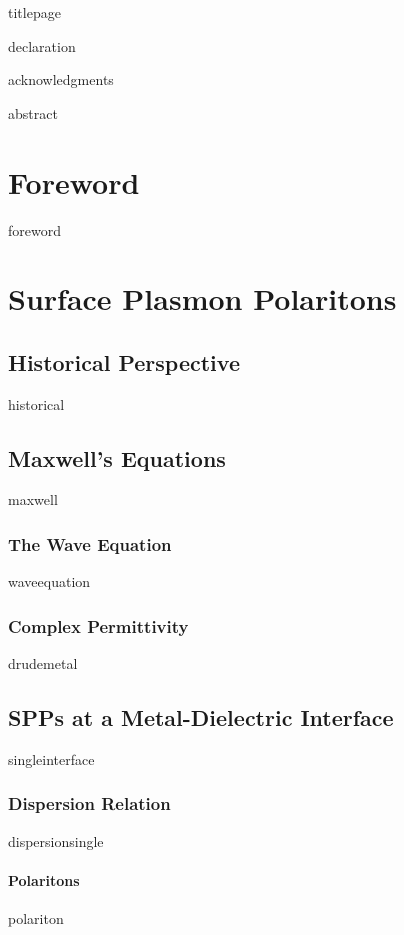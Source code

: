 \documentclass[a4paper,titlepage,onecolumn]{report}
\begin{document}
{titlepage}

{declaration}

{acknowledgments}

\tableofcontents

{abstract}



\chapter{Foreword} \label{ch:foreword}
{foreword}

\chapter{Surface Plasmon Polaritons} \label{ch:existence}
 \section{Historical Perspective}
 {historical}
 \section{Maxwell's Equations}
 {maxwell}
  \subsection{The Wave Equation}
  {waveequation}
  \subsection{Complex Permittivity}
  {drudemetal}
 \section{SPPs at a Metal-Dielectric Interface}
 {singleinterface}
  \subsection{Dispersion Relation}
  {dispersionsingle}
		\subsubsection{Polaritons}
		{polariton}
\end{document}
